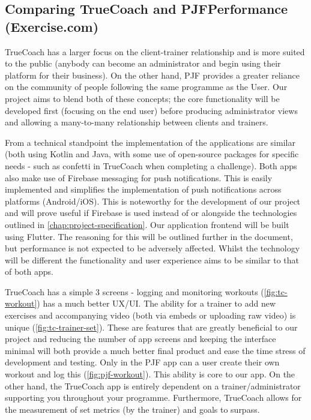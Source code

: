 \subsection{Comparing TrueCoach and PJFPerformance (Exercise.com)}
TrueCoach has a larger focus on the client-trainer relationship and is more suited to
the public (anybody can become an administrator and begin using their platform for their business).
On the other hand, PJF provides a greater reliance on the community of people following the same 
programme as the User. Our project aims to blend both of these concepts; the core functionality will be developed first (focusing on the end user)
before producing administrator views and allowing a many-to-many relationship between clients and trainers.
\par
From a technical standpoint the implementation of the applications are similar (both using Kotlin and Java, with
some use of open-source packages for specific needs - such as confetti in TrueCoach when completing a challenge).
Both apps also make use of Firebase messaging for push notifications. This is easily implemented
and simplifies the implementation of push notifications across platforms (Android/iOS). This is noteworthy for
the development of our project and will prove useful if Firebase is used instead of or alongside the technologies outlined
in \cref{chap:project-specification}. Our application frontend will be built
using Flutter. The reasoning for this will be outlined further in the document, but performance is not expected to be adversely affected.
Whilst the technology will be different the functionality and user experience aims to be similar to that of both apps.
\par
TrueCoach has a simple 3 screens - logging and monitoring workouts (\cref{fig:tc-workout}) has a much better UX/UI.
The ability for a trainer to add new exercises and accompanying video
 (both via embeds or uploading raw video) is unique (\cref{fig:tc-trainer-set}). These are features that are
greatly beneficial to our project and reducing the number of app screens and keeping the interface minimal will
both provide a much better final product and ease the time stress of development and testing.
Only in the PJF app can a user create their own workout and log this (\cref{fig:pjf-workout}). This ability is
core to our app. On the other hand, the TrueCoach app is entirely dependent
on a trainer/administrator supporting you throughout your programme. Furthermore,
TrueCoach allows for the measurement of set metrics (by the trainer) and goals to surpass.

